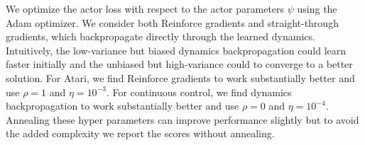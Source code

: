 We optimize the actor loss with respect to the actor parameters $\psi$ using the Adam optimizer. We consider both Reinforce gradients and straight-through gradients, which backpropagate directly through the learned dynamics. Intuitively, the low-variance but biased dynamics backpropagation could learn faster initially and the unbiased but high-variance could to converge to a better solution. For Atari, we find Reinforce gradients to work substantially better and use $\rho=1$ and $\eta=10^{-3}$. For continuous control, we find dynamics backpropagation to work substantially better and use $\rho=0$ and $\eta=10^{-4}$. Annealing these hyper parameters can improve performance slightly but to avoid the added complexity we report the scores without annealing.